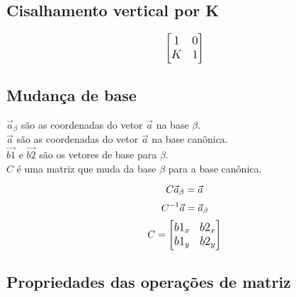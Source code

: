 \documentclass[10pt, a4paper, oneside]{book}
\begin{document}
\subsection{Cisalhamento vertical por K}

\begin{equation*} 
\large
\begin{bmatrix}
    1 & 0 \\
    K & 1
\end{bmatrix}
\end{equation*}


\subsection{Mudança de base}

{\large $\vec{a}_\beta$ são as coordenadas do vetor $\vec{a}$ na base $\beta$.\\}
{\large $\vec{a}$ são as coordenadas do vetor $\vec{a}$ na base canônica.\\}
{\large $\vec{b1}$ e $\vec{b2}$ são os vetores de base para $\beta$.\\}
{\large $C$ é uma matriz que muda da base $\beta$ para a base canônica.}

\begin{equation*}
\large C \vec{a}_\beta = \vec{a}
\end{equation*} 
\begin{equation*}
\large C^{-1} \vec{a} = \vec{a}_\beta
\end{equation*} 
\begin{equation*} 
\large
C = 
\begin{bmatrix}
    b1_x & b2_x \\
    b1_y & b2_y
\end{bmatrix}
\end{equation*}


\subsection{Propriedades das operações de matriz}
\end{document}
